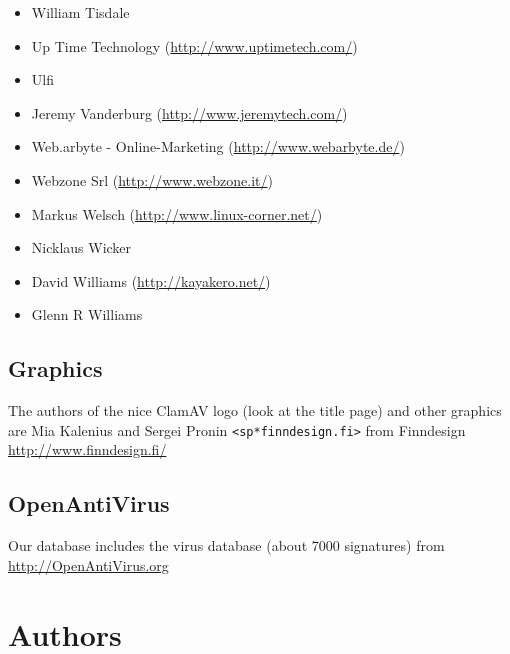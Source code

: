 \documentclass[a4paper,titlepage,12pt]{article}
\newcommand{\email}[1]{\texttt{#1}}
\begin{document}
\begin{itemize}
	\item William Tisdale
	\item Up Time Technology (\url{http://www.uptimetech.com/})
	\item Ulfi
	\item Jeremy Vanderburg (\url{http://www.jeremytech.com/})
	\item Web.arbyte - Online-Marketing (\url{http://www.webarbyte.de/})
	\item Webzone Srl (\url{http://www.webzone.it/})
	\item Markus Welsch (\url{http://www.linux-corner.net/})
	\item Nicklaus Wicker
	\item David Williams (\url{http://kayakero.net/})
	\item Glenn R Williams
    \end{itemize}

    \subsection{Graphics}
    The authors of the nice ClamAV logo (look at the title page) and other
    graphics are Mia Kalenius and Sergei Pronin \email{<sp*finndesign.fi>}
    from Finndesign \url{http://www.finndesign.fi/}

    \subsection{OpenAntiVirus}
    Our database includes the virus database (about 7000 signatures) from\\
    \url{http://OpenAntiVirus.org}

    \section{Authors}
\end{document}
